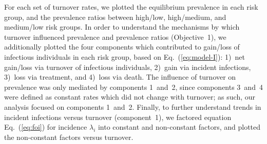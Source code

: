 For each set of turnover rates,
we plotted the equilibrium prevalence in each risk group,
and the prevalence ratios between high/low, high/medium, and medium/low risk groups.
In order to understand the mechanisms by which
turnover influenced prevalence and prevalence ratios (Objective~1),
we additionally plotted the four components which contributed to
gain/loss of infectious individuals in each risk group,
based on Eq.~(\ref{eq:model-I}):
1)~net gain/loss via turnover of infectious individuals,
2)~gain via incident infections,
3)~loss via treatment, and
4)~loss via death.
The influence of turnover on prevalence
was only mediated by components 1~and~2,
since components 3~and~4 were defined as
constant rates which did not change with turnover;
as such, our analysis focused on components 1~and~2.
Finally, to further understand trends in incident infections versus turnover (component~1),
we factored equation Eq.~(\ref{eq:foi}) for incidence $\lambda_i$
into constant and non-constant factors,
and plotted the non-constant factors versus turnover.
